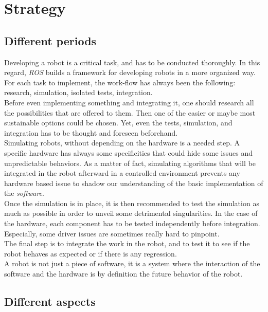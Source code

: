 	\section{Strategy}
	
		\subsection{Different periods}

		Developing a robot is a critical task, and has to be conducted thoroughly. 
		In this regard, \textit{ROS} builds a framework for developing 
		robots in a more organized way. For each task to implement, 
		the work-flow has always been the following: research, simulation, isolated 
		tests, integration.
		\\\indent Before even implementing something and integrating it, one should 
		research all the possibilities that are offered to them. Then one of the 
		easier or maybe most sustainable options could be chosen. Yet, even the
		tests, simulation, and integration has to be thought and foreseen beforehand.
		\\\indent Simulating robots, without depending on the hardware is
		a needed step.	 A specific hardware has always some specificities that
		could hide some issues and unpredictable behaviors. As a matter of fact, 
		simulating algorithms that will be integrated in the robot afterward in 
		a controlled environment prevents any hardware based issue to shadow
		our understanding of the basic implementation of
		the \textit{software}.
		\\\indent Once the simulation is in place, it is then 
		recommended to test the simulation as much as possible in order
		to unveil some detrimental singularities. In the case of the hardware, 
		each component has to be tested independently before integration.
		Especially, some driver issues are sometimes really 
		hard to pinpoint.
		\\\indent The final step is to integrate the work in the robot, and
		to test it to see if the robot behaves as expected or if there 
		is any regression.
		\\\indent A robot is not just a piece of software, it is a system 
		where the interaction of the software and the hardware is by 
		definition the future behavior of the robot.
		
		\subsection{Different aspects}

